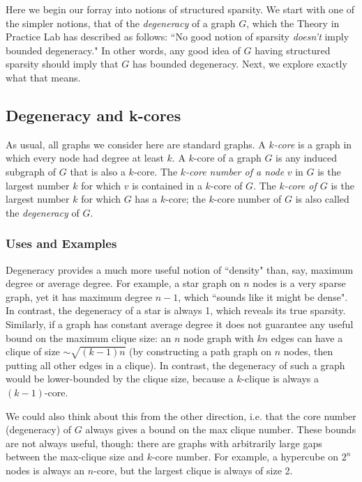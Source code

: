 

Here we begin our forray into notions of structured sparsity. We start with one of the simpler notions, that of the \emph{degeneracy} of a graph $G$, which the Theory in Practice Lab has described as follows:
``No good notion of sparsity \emph{doesn't} imply bounded degeneracy." In other words, any good idea of $G$ having structured sparsity should imply that $G$ has bounded degeneracy. Next, we explore exactly what that means.


\subsection{Degeneracy and k-cores}\label{sec:degeneracy}

As usual, all graphs we consider here are standard graphs.
A \emph{$k$-core} is a graph in which every node had degree at least $k$. A $k$-core of a graph $G$ is any induced subgraph of $G$ that is also a $k$-core.
The \emph{$k$-core number of a node} $v$ in $G$ is the largest number $k$ for which $v$ is contained in a $k$-core of $G$.
The \emph{$k$-core of $G$} is the largest number $k$ for which $G$ has a $k$-core;
the $k$-core number of $G$ is also called the \emph{degeneracy} of $G$.


\subsubsection{Uses and Examples}

Degeneracy provides a much more useful notion of ``density" than, say, maximum degree or average degree.
For example, a star graph on $n$ nodes is a very sparse graph, yet it has maximum degree $n-1$, which ``sounds like it might be dense". In contrast, the degeneracy of a star is always 1, which reveals its  true sparsity.
Similarly, if a graph has constant average degree it does not guarantee any useful bound on the maximum clique size: an $n$ node graph with $kn$ edges can have a clique of size $\sim \sqrt{(k-1)n}$ (by constructing a path graph on $n$ nodes, then putting all other edges in a clique).
In contrast, the degeneracy of such a graph would be lower-bounded by the clique size, because a $k$-clique is always a $(k-1)$-core.

We could also think about this from the other direction, i.e. that the core number (degeneracy) of $G$ always gives a bound on the max clique number.
These bounds are not always useful, though: there are graphs with arbitrarily large gaps between the max-clique size and $k$-core number.
For example, a hypercube on $2^n$ nodes is always an $n$-core, but the largest clique is always of size 2.

